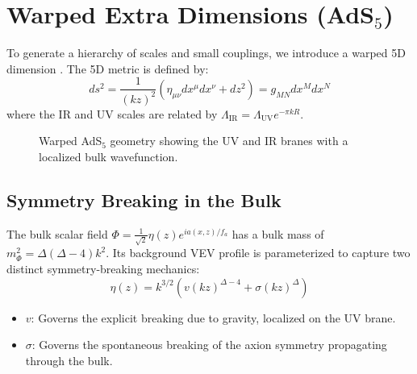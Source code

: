 \documentclass[11pt]{article}
\begin{document}
\section{Warped Extra Dimensions (AdS$_5$)}
To generate a hierarchy of scales and small couplings, we introduce a warped 5D dimension \cite{cox2019}. The 5D metric is defined by:
\begin{equation}
    ds^2 = \frac{1}{(kz)^2} \left( \eta_{\mu\nu} dx^\mu dx^\nu + dz^2 \right) = g_{MN} dx^M dx^N
\end{equation}
where the IR and UV scales are related by $\Lambda_{\text{IR}} = \Lambda_{\text{UV}} e^{-\pi k R}$. 

\begin{figure}[h]
    \centering
    \caption{Warped AdS$_5$ geometry showing the UV and IR branes with a localized bulk wavefunction.}
    \label{fig:warped_geometry}
\end{figure}

\subsection{Symmetry Breaking in the Bulk}
The bulk scalar field $\Phi = \frac{1}{\sqrt{2}} \eta(z) e^{i a(x,z) / f_a}$ has a bulk mass of $m_\Phi^2 = \Delta(\Delta-4)k^2$. Its background VEV profile is parameterized to capture two distinct symmetry-breaking mechanics:
\begin{equation}
    \eta(z) = k^{3/2} \left( v(kz)^{\Delta-4} + \sigma(kz)^\Delta \right)
\end{equation}
\begin{itemize}
    \item $v$: Governs the explicit breaking due to gravity, localized on the UV brane.
    \item $\sigma$: Governs the spontaneous breaking of the axion symmetry propagating through the bulk.
\end{itemize}
\end{document}
